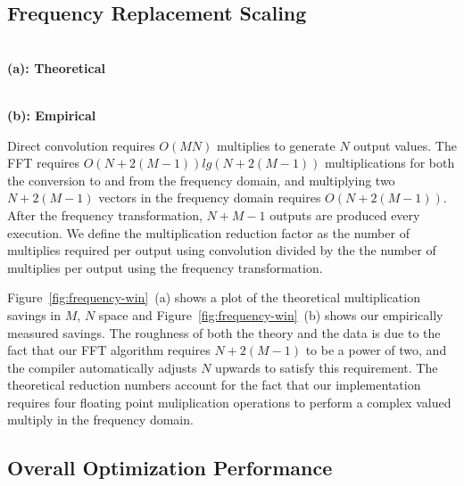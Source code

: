 \subsection{Frequency Replacement Scaling}

\begin{figure*}[t]
\center
\begin{minipage}{3.4 in}
\center
\epsfxsize=2.2in
 \\
{\bf (a): Theoretical}
\end{minipage} 
\begin{minipage}{3.4 in}
\center
\epsfxsize=2.2in
 \\
{\bf (b): Empirical}
\end{minipage}
\caption{Plots showing the theoretical and emphirical multiplication reduction factor as a function of the size of the FIR ($M$) and the number of outputs produced ($N$). The dark regions denote an increase in the required number of multiplications.}
\label{fig:frequency-win}
\vspace{-12pt}
\end{figure*}

Direct convolution requires $O(MN)$ multiplies to generate $N$ output
values. The FFT requires $O(N+2(M-1))lg(N+2(M-1))$ multiplications for both the
conversion to and from the frequency domain, and multiplying two $N+2(M-1)$
vectors in the frequency domain requires $O(N+2(M-1))$. After the frequency transformation,
$N+M-1$ outputs are produced every execution. We define the multiplication reduction factor
as the number of multiplies required per output using convolution divided by the 
the number of multiplies per output using the frequency transformation. 

Figure~\ref{fig:frequency-win}~(a) shows a plot of the theoretical multiplication savings
in $M$, $N$ space and Figure~\ref{fig:frequency-win}~(b) shows our empirically 
measured savings. The roughness of both the theory and the data is due to the fact that
our FFT algorithm requires $N+2(M-1)$ to be a power of two, and the compiler
automatically adjusts $N$ upwards to satisfy this requirement. The theoretical 
reduction numbers account for the fact that our implementation requires four 
floating point muliplication operations to perform a complex valued multiply 
in the frequency domain.

\subsection{Overall Optimization Performance}

